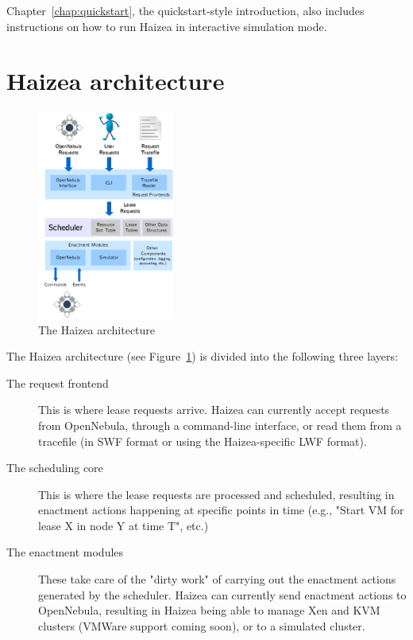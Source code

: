 Chapter~\ref{chap:quickstart}, the quickstart-style introduction, also includes instructions on how to run Haizea in interactive simulation mode.

\section{Haizea architecture}

\begin{figure}
\begin{center}
\includegraphics[width=0.4\textwidth]{images/architecture.png}
\end{center}
\caption{The Haizea architecture}
\label{fig:arch}
\end{figure}

The Haizea architecture (see Figure~\ref{fig:arch}) is divided into the following three layers:

\begin{description}
\item[The request frontend] This is where lease requests arrive. Haizea can currently accept requests from OpenNebula, through a command-line interface, or read them from a tracefile (in SWF format or using the Haizea-specific LWF format).
\item[The scheduling core] This is where the lease requests are processed and scheduled, resulting in enactment actions happening at specific points in time (e.g., "Start VM for lease X in node Y at time T", etc.)
\item[The enactment modules] These take care of the "dirty work" of carrying out the enactment actions generated by the scheduler. Haizea can currently send enactment actions to OpenNebula, resulting in Haizea being able to manage Xen and KVM clusters (VMWare support coming soon), or to a simulated cluster.
\end{description}

